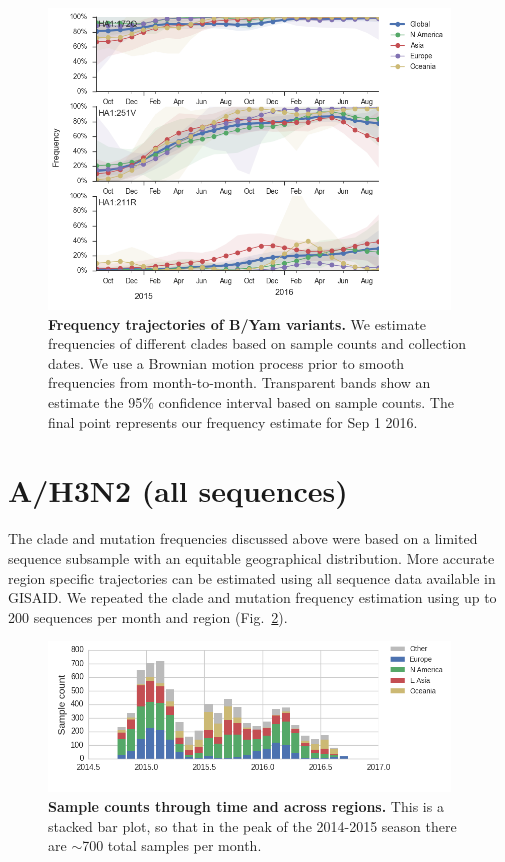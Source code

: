 \documentclass[11pt,oneside,letterpaper]{article}
\begin{document}
\begin{figure}[H]
	\centering
	\includegraphics[width=0.95\textwidth]{../figures/sep-2016/Yam_mutations.png}
	\caption{\textbf{Frequency trajectories of B/Yam variants.}
	We estimate frequencies of different clades based on sample counts and collection dates.
	We use a Brownian motion process prior to smooth frequencies from month-to-month.
	Transparent bands show an estimate the 95\% confidence interval based on sample counts.
	The final point represents our frequency estimate for Sep 1 2016.
	}
	\label{Yam_mutations}
\end{figure}

\clearpage
\pagebreak

\section*{A/H3N2 (all sequences)}

The clade and mutation frequencies discussed above were based on a limited sequence subsample with an equitable geographical distribution. More accurate region specific trajectories can be estimated using all sequence data available in GISAID. We repeated the clade and mutation frequency estimation using up to 200 sequences per month and region (Fig.\ \ref{H3N2_counts_all}).

\begin{figure}[H]
	\centering
	\includegraphics[width=0.95\textwidth]{../figures/sep-2016/H3N2_counts_all.png}
	\caption{\textbf{Sample counts through time and across regions.}
	This is a stacked bar plot, so that in the peak of the 2014-2015 season there are $\sim$700 total samples per month.
	}
	\label{H3N2_counts_all}
\end{figure}
\end{document}
